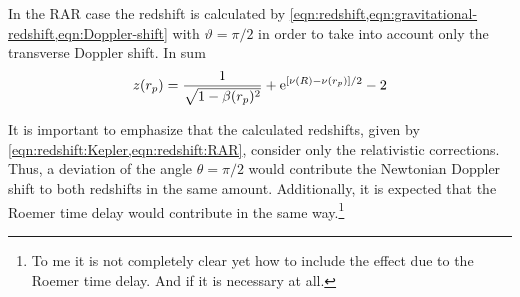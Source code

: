 In the RAR case the redshift is calculated by \cref{eqn:redshift,eqn:gravitational-redshift,eqn:Doppler-shift} with $\vartheta = \pi/2$ in order to take into account only the transverse Doppler shift. In sum \begin{equation}
	\label{eqn:redshift:RAR}
	z(r_p) = \frac{1}{\sqrt{1 - \beta(r_p)^2}} + \mathrm{e}^{[\nu(R) - \nu(r_p)]/2} - 2
\end{equation}

It is important to emphasize that the calculated redshifts, given by \cref{eqn:redshift:Kepler,eqn:redshift:RAR}, consider only the relativistic corrections. Thus, a deviation of the angle $\theta=\pi/2$ would contribute the Newtonian Doppler shift to both redshifts in the same amount. Additionally, it is expected that the Roemer time delay would contribute in the same way.\footnote{To me it is not completely clear yet how to include the effect due to the Roemer time delay. And if it is necessary at all.}